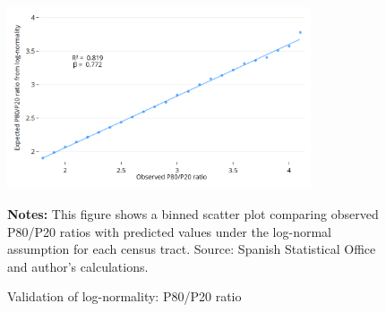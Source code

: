 \begin{figure}[H]
\begin{center}
\captionsetup{justification=centering}
\caption{Validation of log-normality: P80/P20 ratio}
\label{fig:p80p20}
\includegraphics[width=0.8\textwidth]{output/binned_scatter_p80p20_2023.png}
\end{center}
\begin{fignotes2}
\textbf{Notes:} This figure shows a binned scatter plot comparing observed P80/P20 ratios with predicted values under the log-normal assumption for each census tract. Source: Spanish Statistical Office and author's calculations.
\end{fignotes2}
\end{figure}


